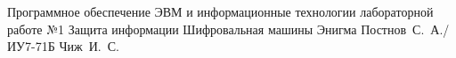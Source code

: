 \documentclass{bmstu}
\begin{document}
	
	{Программное обеспечение ЭВМ и информационные технологии}
	{лабораторной работе №1}
	{Защита информации}
	{Шифровальная машины Энигма}
	{}
	{Постнов~С.~А./ИУ7-71Б}
	{Чиж~И.~С.}
	
	\maketableofcontents
	
	
	
	
	
	
	
	\makebibliography
	
\end{document}
